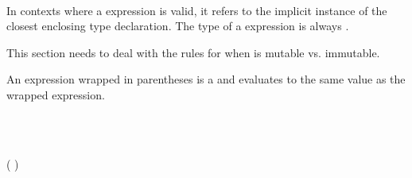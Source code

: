 
\begin{Syntax}
         \\
\end{Syntax}

\begin{Checking}
\end{Checking}


\begin{Description}
In contexts where a  expression is valid, it refers to the implicit instance of the closest enclosing type declaration.
The type of a  expression is always .
\end{Description}

\begin{Incomplete}
This section needs to deal with the rules for when  is mutable vs. immutable.
\end{Incomplete}


\begin{Description}
An expression wrapped in parentheses \code{()} is a  and evaluates to the same value as the wrapped expression.
\end{Description}

\begin{Syntax}
        \code{(}  \code{)} \\
\end{Syntax}

\begin{Checking}
	\vspace{1em}

\end{Checking}



\begin{Syntax}
	 \\
         \code{(} ( \code{,})\SynStar \code{)} \\

     \\
         \\
        \SynOr {} \\

     \\
         \code{:} 
\end{Syntax}

